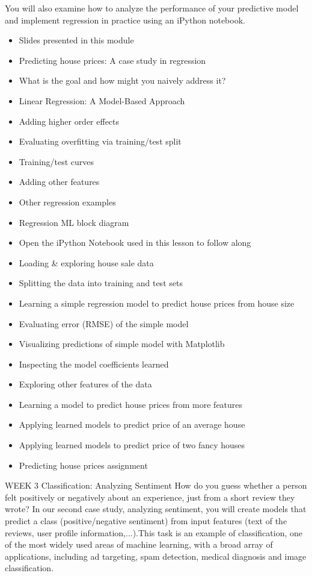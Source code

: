 You will also examine how to analyze the performance of your predictive model and implement regression in practice using an iPython notebook.
\begin{itemize}
\item Slides presented in this module
\item Predicting house prices: A case study in regression
\item What is the goal and how might you naively address it?
\item Linear Regression: A Model-Based Approach
\item Adding higher order effects
\item Evaluating overfitting via training/test split
\item Training/test curves
\item Adding other features
\item Other regression examples
\item Regression ML block diagram
\item Open the iPython Notebook used in this lesson to follow along
\item Loading & exploring house sale data
\item Splitting the data into training and test sets
\item Learning a simple regression model to predict house prices from house size
\item Evaluating error (RMSE) of the simple model
\item Visualizing predictions of simple model with Matplotlib
\item Inspecting the model coefficients learned
\item Exploring other features of the data
\item Learning a model to predict house prices from more features
\item Applying learned models to predict price of an average house
\item Applying learned models to predict price of two fancy houses
\item Predicting house prices assignment
\end{itemize}
WEEK 3
Classification: Analyzing Sentiment
How do you guess whether a person felt positively or negatively about an experience, just from a short review they wrote?
In our second case study, analyzing sentiment, you will create models that predict a class (positive/negative sentiment) from input features (text of the reviews, user profile information,...).This task is an example of classification, one of the most widely used areas of machine learning, with a broad array of applications, including ad targeting, spam detection, medical diagnosis and image classification.

